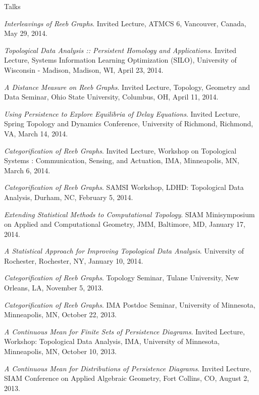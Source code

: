 \documentclass{resume} %
\begin{document}
\begin{rSection}{Talks}
\begin{etaremune}
\item\emph{Interleavings of Reeb Graphs}. Invited Lecture, ATMCS 6, Vancouver, Canada, May 29, 2014. 

\item\emph{Topological Data Analysis :: Persistent Homology and Applications}. Invited Lecture, Systems Information Learning Optimization (SILO), University of Wisconsin - Madison, Madison, WI, April 23, 2014. 

\item\emph{A Distance Measure on Reeb Graphs}. Invited Lecture, Topology, Geometry and Data Seminar, Ohio State University, Columbus, OH, April 11, 2014. 

\item\emph{Using Persistence to Explore Equilibria of Delay Equations}. Invited Lecture, Spring Topology and Dynamics Conference, University of Richmond, Richmond, VA, March 14, 2014. 

\item\emph{Categorification of Reeb Graphs}. Invited Lecture, Workshop on Topological Systems : Communication, Sensing, and Actuation, IMA, Minneapolis, MN, March 6, 2014. 

\item\emph{Categorification of Reeb Graphs}. SAMSI Workshop, LDHD: Topological Data Analysis, Durham, NC, February 5, 2014. 

\item\emph{Extending Statistical Methods to Computational Topology}. SIAM Minisymposium on Applied and Computational Geometry, JMM, Baltimore, MD, January 17, 2014. 

\item\emph{A Statistical Approach for Improving Topological Data Analysis}. University of Rochester, Rochester, NY, January 10, 2014. 

\item\emph{Categorification of Reeb Graphs}. Topology Seminar, Tulane University, New Orleans, LA, November 5, 2013. 

\item\emph{Categorification of Reeb Graphs}. IMA Postdoc Seminar, University of Minnesota, Minneapolis, MN, October 22, 2013. 

\item\emph{A Continuous Mean for Finite Sets of Persistence Diagrams}. Invited Lecture, Workshop: Topological Data Analysis, IMA, University of Minnesota, Minneapolis, MN, October 10, 2013. 

\item\emph{A Continuous Mean for Distributions of Persistence Diagrams}. Invited Lecture, SIAM Conference on Applied Algebraic Geometry, Fort Collins, CO, August 2, 2013. 


\end{etaremune}
\end{rSection}
\end{document}
